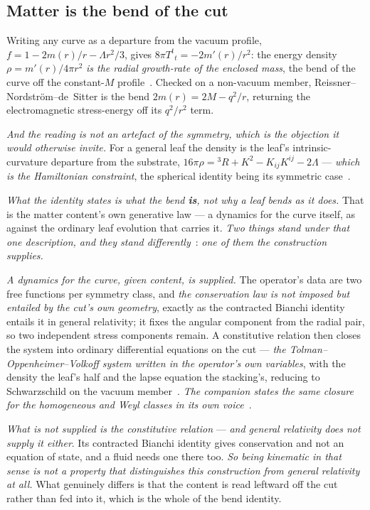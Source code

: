 \documentclass[11pt,a4paper]{article}
\theoremstyle{plain}
\theoremstyle{definition}
\begin{document}
\subsection{Matter is the bend of the cut}

Writing any curve as a departure from the vacuum profile, $f=1-2m(r)/r-\Lambda r^{2}/3$, gives
$8\pi T^{t}{}_{t}=-2m'(r)/r^{2}$: the energy density $\rho=m'(r)/4\pi r^{2}$ \emph{is the radial growth-rate
of the enclosed mass}, the bend of the curve off the constant-$M$ profile~\cite{JanzenOperator}. Checked on a
non-vacuum member, Reissner--Nordstr\"om--de~Sitter is the bend $2m(r)=2M-q^{2}/r$, returning the
electromagnetic stress-energy off its $q^{2}/r^{2}$ term.

\emph{And the reading is not an artefact of the symmetry, which is the objection it would otherwise invite.}
For a general leaf the density is the leaf's intrinsic-curvature departure from the substrate,
$16\pi\rho={}^{3}R+K^{2}-K_{ij}K^{ij}-2\Lambda$ --- \emph{which is the Hamiltonian constraint}, the spherical
identity being its symmetric case~\cite{JanzenOperator}.

\emph{What the identity states is what the bend \textbf{is}, not why a leaf bends as it does.} That is the
matter content's own generative law --- a dynamics for the curve itself, as against the ordinary leaf
evolution that carries it. \emph{Two things stand under that one description, and they stand
differently}~\cite{JanzenOperator}: \emph{one of them the construction supplies.}

\emph{A dynamics for the curve, given content, is supplied.} The operator's data are two free functions per
symmetry class, and \emph{the conservation law is not imposed but entailed by the cut's own geometry},
exactly as the contracted Bianchi identity entails it in general relativity; it fixes the angular component
from the radial pair, so two independent stress components remain. A constitutive relation then closes the
system into ordinary differential equations on the cut --- \emph{the Tolman--Oppenheimer--Volkoff system
written in the operator's own variables}, with the density the leaf's half and the lapse equation the
stacking's, reducing to Schwarzschild on the vacuum member~\cite{JanzenOperator}.
\emph{The companion states the same closure for the homogeneous and Weyl classes in its own
voice}~\cite{JanzenGroupoid}.

\emph{What is not supplied is the constitutive relation} --- \emph{and general relativity does not supply it
either}. Its contracted Bianchi identity gives conservation and not an equation of state, and a fluid needs
one there too. \emph{So being kinematic in that sense is not a property that distinguishes this construction from
general relativity at all.} What genuinely differs is that the content is read leftward off the cut
rather than fed into it, which is the whole of the bend identity.
\end{document}
